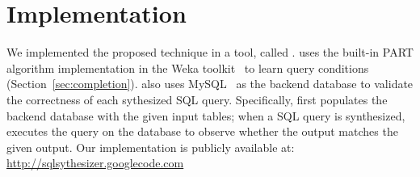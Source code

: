 
\section{Implementation}
\label{sec:implementation}

We implemented the proposed technique in a tool, called \ourtool. 
\ourtool uses the built-in PART algorithm implementation in
the Weka toolkit~\cite{Hall:2009} to learn query conditions
(Section~\ref{sec:completion}). \ourtool also uses
MySQL~\cite{mysql} as the backend
database to validate the correctness of each sythesized
SQL query. Specifically, \ourtool first populates the backend database
with the given input tables; when a SQL query is
synthesized, \ourtool executes the query on the database
to observe whether the output matches the given output.
Our implementation is publicly available at:
\url{http://sqlsythesizer.googlecode.com}
